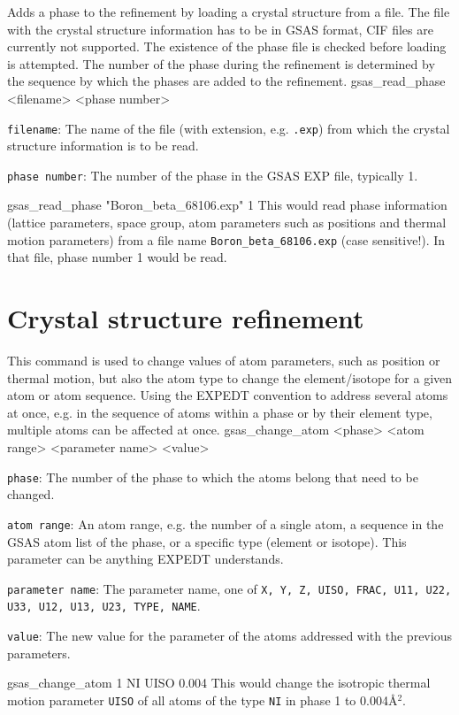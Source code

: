 {
Adds a phase to the refinement by loading a crystal structure from a file. The file with the crystal structure information has to be in GSAS format, CIF files are currently not supported. The existence of the phase file is checked before loading is attempted. The number of the phase during the refinement is determined by the sequence by which the phases are added to the refinement.
}{
gsas\_read\_phase <filename> <phase number>
}{
\item \texttt{filename}: The name of the file (with extension, e.g. \texttt{.exp}) from which the crystal structure information is to be read.
\item \texttt{phase number}: The number of the phase in the GSAS EXP file, typically 1.
}{
gsas\_read\_phase "Boron\_beta\_68106.exp" 1
}{
This would read phase information (lattice parameters, space group, atom parameters such as positions and thermal motion parameters) from a file name \texttt{Boron\_beta\_68106.exp} (case sensitive!). In that file, phase number 1 would be read.
}

\section{Crystal structure refinement}

{
This command is used to change values of atom parameters, such as position or thermal motion, but also the atom type to change the element/isotope for a given atom or atom sequence. Using the EXPEDT convention to address several atoms at once, e.g. in the sequence of atoms within a phase or by their element type, multiple atoms can be affected at once.
}{
gsas\_change\_atom <phase> <atom range> <parameter name> <value>
}{
\item \texttt{phase}: The number of the phase to which the atoms belong that need to be changed.
\item \texttt{atom range}: An atom range, e.g. the number of a single atom, a sequence in the GSAS atom list of the phase, or a specific type (element or isotope). This parameter can be anything EXPEDT understands.
\item \texttt{parameter name}: The parameter name, one of \texttt{X, Y, Z, UISO, FRAC, U11, U22, U33, U12, U13, U23, TYPE, NAME}.
\item \texttt{value}: The new value for the parameter of the atoms addressed with the previous parameters. 
}{
gsas\_change\_atom 1 NI UISO 0.004
}{
This would change the isotropic thermal motion parameter \texttt{UISO} of all atoms of the type \texttt{NI} in phase 1 to 0.004\AA$^2$.
}

